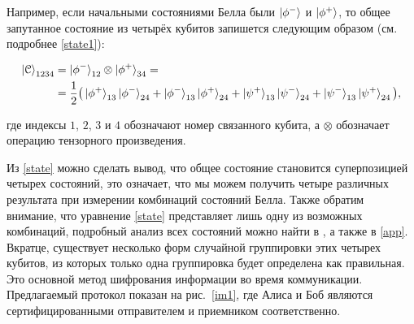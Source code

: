 \documentclass[a4paper,11pt]{article}
\begin{document}

Например, если начальными состояниями Белла были $\ket{\phi^-}$ и $\ket{\phi^+}$, то общее запутанное состояние из четырёх кубитов запишется следующим образом (см. подробнее \eqref{state1}):

\begin{align}\label{state}
\ket{\mathcal{C}}_{1234} &= \ket{\phi^-}_{12} \otimes \ket{\phi^+}_{34} = \nonumber \\
&= \dfrac{1}{2} \big(\ket{\phi^+}_{13} \ket{\phi^-}_{24} + 
 					\ket{\phi^-}_{13} \ket{\phi^+}_{24} +
 					\ket{\psi^+}_{13} \ket{\psi^-}_{24} +
 					\ket{\psi^-}_{13} \ket{\psi^+}_{24} \big),
\end{align}

где индексы $1$, $2$, $3$ и $4$ обозначают номер связанного кубита, а $\otimes$ обозначает операцию тензорного произведения.


Из \eqref{state} можно сделать вывод, что общее состояние становится суперпозицией четырех состояний, это означает, что мы можем получить четыре различных результата при измерении комбинаций состояний Белла. Также обратим внимание, что уравнение \eqref{state} представляет лишь одну из возможных комбинаций, подробный анализ всех состояний можно найти в \cite{base,entang}, а также в \ref{app}. Вкратце, существует несколько форм случайной группировки этих четырех кубитов, из которых только одна группировка будет определена как правильная. Это основной метод шифрования информации во время коммуникации. Предлагаемый протокол показан на рис.~\ref{im1}, где Алиса и Боб являются сертифицированными отправителем и приемником соответственно.
\end{document}

